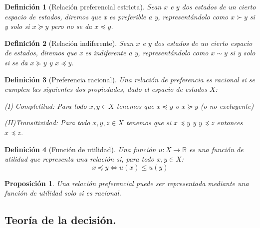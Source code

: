 \documentclass[16pt, a4paper]{article} %
\newcommand{\R}{\ensuremath{\mathbb{R}}}
\newtheorem{definicion}{Definición}[section]
\newtheorem{propo}{Proposición}[section]
\begin{document}
\begin{definicion}[Relación preferencial estricta]
Sean $x$ e $y$ dos estados de un cierto espacio de estados, diremos que x es preferible a y, representándolo como $x \succ y$ si y solo si $x \succeq y$ pero no se da $x \preceq y$. 
\end{definicion}

\begin{definicion}[Relación indiferente]
Sean $x$ e $y$ dos estados de un cierto espacio de estados, diremos que x es indiferente a y, representándolo como $x \sim y$ si y solo si se da  $x \succeq y$ y $x \preceq y$.
\end{definicion}

\begin{definicion}[Preferencia racional]
Una relación de preferencia es racional si se cumplen las siguientes dos propiedades, dado el espacio de estados $X$:

(I) Completitud: Para todo $x,y \in X$ tenemos que $x \preceq y$ o $x \succeq y$ (o no excluyente)

(II)Transitividad: Para todo $x, y, z \in X$ tenemos que si $x \preceq y$ y $y \preceq z$ entonces $x \preceq z$.
\end{definicion}

\begin{definicion}[Función de utilidad]
Una función $u:X \to \R$ es una función de utilidad que representa una relación si, para todo $x,y \in X$:
$$ 
x \preceq y \iff u(x)\le u(y)
$$

\end{definicion}

\begin{propo}
Una relación preferencial puede ser representada mediante una función de utilidad solo si es racional.
\end{propo}










\subsection{Teoría de la decisión.}
\end{document}
